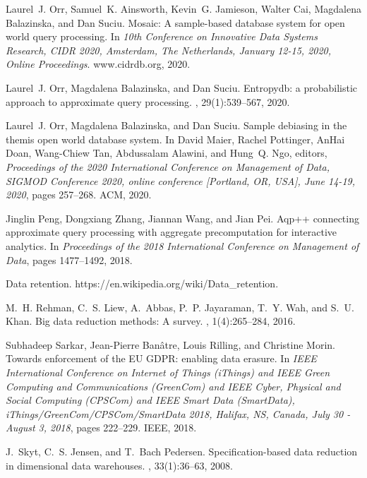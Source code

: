 \documentclass[11pt,dvipdfm]{article}
\begin{document}
\begin{thebibliography}{10}
\begin{small}
Laurel~J. Orr, Samuel~K. Ainsworth, Kevin~G. Jamieson, Walter Cai, Magdalena
  Balazinska, and Dan Suciu.
\newblock Mosaic: {A} sample-based database system for open world query
  processing.
\newblock In {\em 10th Conference on Innovative Data Systems Research, {CIDR}
  2020, Amsterdam, The Netherlands, January 12-15, 2020, Online Proceedings}.
  www.cidrdb.org, 2020.

Laurel~J. Orr, Magdalena Balazinska, and Dan Suciu.
\newblock Entropydb: a probabilistic approach to approximate query processing.
, 29(1):539--567, 2020.

Laurel~J. Orr, Magdalena Balazinska, and Dan Suciu.
\newblock Sample debiasing in the themis open world database system.
\newblock In David Maier, Rachel Pottinger, AnHai Doan, Wang{-}Chiew Tan,
  Abdussalam Alawini, and Hung~Q. Ngo, editors, {\em Proceedings of the 2020
  International Conference on Management of Data, {SIGMOD} Conference 2020,
  online conference [Portland, OR, USA], June 14-19, 2020}, pages 257--268.
  {ACM}, 2020.

Jinglin Peng, Dongxiang Zhang, Jiannan Wang, and Jian Pei.
\newblock Aqp++ connecting approximate query processing with aggregate
  precomputation for interactive analytics.
\newblock In {\em Proceedings of the 2018 International Conference on
  Management of Data}, pages 1477--1492, 2018.

Data retention.
\newblock https://en.wikipedia.org/wiki/Data\_retention.

M.~H. Rehman, C.~S. Liew, A.~Abbas, P.~P. Jayaraman, T.~Y. Wah, and S.~U. Khan.
\newblock Big data reduction methods: {A} survey.
, 1(4):265--284, 2016.

Subhadeep Sarkar, Jean{-}Pierre Ban{\^{a}}tre, Louis Rilling, and Christine
  Morin.
\newblock Towards enforcement of the {EU} {GDPR:} enabling data erasure.
\newblock In {\em {IEEE} International Conference on Internet of Things
  (iThings) and {IEEE} Green Computing and Communications (GreenCom) and {IEEE}
  Cyber, Physical and Social Computing (CPSCom) and {IEEE} Smart Data
  (SmartData), iThings/GreenCom/CPSCom/SmartData 2018, Halifax, NS, Canada,
  July 30 - August 3, 2018}, pages 222--229. {IEEE}, 2018.

J.~Skyt, C.~S. Jensen, and T.~Bach Pedersen.
\newblock Specification-based data reduction in dimensional data warehouses.
, 33(1):36--63, 2008.


\end{small}
\end{thebibliography}
\end{document}
